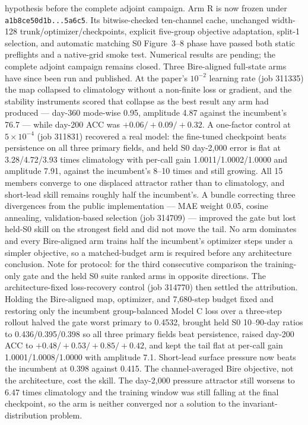 \documentclass[11pt]{article}
\begin{document}
{hypothesis before the complete adjoint campaign.
Arm R is now frozen under \texttt{a1b8ce50d1b...5a6c5}.  Its bitwise-checked
ten-channel cache, unchanged width-128 trunk/optimizer/checkpoints, explicit
five-group objective adaptation, split-1 selection, and automatic matching
S0 Figure~3--8 phase have passed both static preflights and a native-grid
smoke test.  Numerical results are pending; the complete adjoint campaign
remains closed.
Three Bire-aligned full-state arms have since been run and published.  At the
paper's \(10^{-2}\) learning rate (job 311335) the map collapsed to
climatology without a non-finite loss or gradient, and the stability
instruments scored that collapse as the best result any arm had produced ---
day-360 mode-wise 0.95, amplitude 4.87 against the incumbent's 76.7 --- while
day-200 ACC was \(+0.06/+0.09/+0.32\).  A one-factor control at
\(5\times10^{-4}\) (job 311831) recovered a real model: the fine-tuned
checkpoint beats persistence on all three primary fields, and held S0
day-2,000 error is flat at 3.28/4.72/3.93 times climatology with per-call gain
1.0011/1.0002/1.0000 and amplitude 7.91, against the incumbent's 8--10 times
and still growing.  All 15 members converge to one displaced attractor rather
than to climatology, and short-lead skill remains roughly half the
incumbent's.  A bundle correcting three divergences from the public
implementation --- MAE weight 0.05, cosine annealing, validation-based
selection (job 314709) --- improved the gate but lost held-S0 skill on the
strongest field and did not move the tail.  No arm dominates and every
Bire-aligned arm trains half the incumbent's optimizer steps under a simpler
objective, so a matched-budget arm is required before any architecture
conclusion.  Note for protocol: for the third consecutive comparison the
training-only gate and the held S0 suite ranked arms in opposite directions.
The architecture-fixed loss-recovery control (job 314770) then settled the
attribution.  Holding the Bire-aligned map, optimizer, and 7,680-step budget
fixed and restoring only the incumbent group-balanced Model C loss over a
three-step rollout halved the gate worst primary to 0.4532, brought held S0
10--90-day ratios to 0.436/0.395/0.398 so all three primary fields beat
persistence, raised day-200 ACC to \(+0.48/+0.53/+0.85/+0.42\), and kept the
tail flat at per-call gain 1.0001/1.0008/1.0000 with amplitude 7.1.  Short-lead
surface pressure now beats the incumbent at 0.398 against 0.415.  The
channel-averaged Bire objective, not the architecture, cost the skill.  The
day-2,000 pressure attractor still worsens to 6.47 times climatology and the
training window was still falling at the final checkpoint, so the arm is
neither converged nor a solution to the invariant-distribution problem.

}
\end{document}
